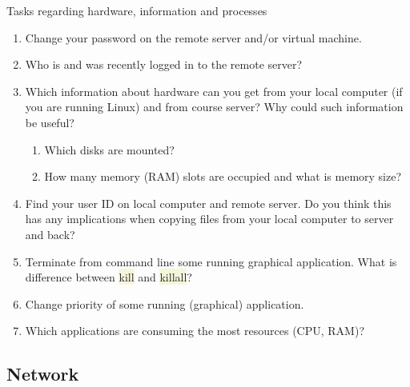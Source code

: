 \documentclass[compress, xelatex, 11pt, xcolor=svgnames, aspectratio=169, url={hyphens, lowtilde}]{beamer}
\renewcommand{\texttt}[1]{\colorbox{Beige}{{\ttfamily #1}}}
\begin{document}
\begin{frame}{Tasks regarding hardware, information and processes}
	\begin{enumerate}
		\item Change your password on the remote server and/or virtual machine.
		\item Who is and was recently logged in to the remote server?
		\item Which information about hardware can you get from your local computer (if you are running Linux) and from course server? Why could such information be useful?
	\begin{enumerate}
		\item Which disks are mounted?
		\item How many memory (RAM) slots are occupied and what is memory size?
	\end{enumerate}
	\item Find your user ID on local computer and remote server. Do you think this has any implications when copying files from your local computer to server and back?
	\item Terminate from command line some running graphical application. What is difference between \texttt{kill} and \texttt{killall}?
	\item Change priority of some running (graphical) application.
	\item Which applications are consuming the most resources (CPU, RAM)?
	\end{enumerate}
\end{frame}

\subsection{Network}
\end{document}
